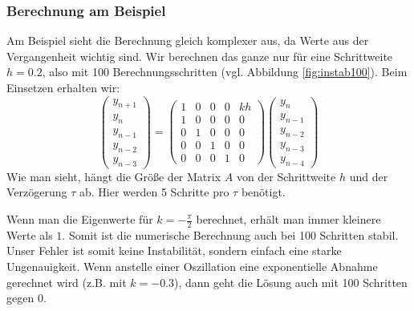 \subsubsection{Berechnung am Beispiel}
Am Beispiel sieht die Berechnung gleich komplexer aus, da Werte aus der Vergangenheit wichtig sind.
Wir berechnen das ganze nur für eine Schrittweite $h=0.2$, also mit 100 Berechnungsschritten (vgl. Abbildung \ref{fig:instab100}).
Beim Einsetzen erhalten wir: 
\begin{equation}
	\left( \begin{array}{c}y_{n+1} \\ y_n \\ y_{n-1} \\ y_{n-2} \\ y_{n-3} \end{array} \right) =
	\begin{pmatrix} 
	1 & 0 & 0 & 0 & kh \\
	1 & 0 & 0 & 0 & 0 \\
	0 & 1 & 0 & 0 & 0 \\
	0 & 0 & 1 & 0 & 0 \\
	0 & 0 & 0 & 1 & 0
	\end{pmatrix}
	\left( \begin{array}{c}y_{n} \\ y_{n-1} \\ y_{n-2} \\ y_{n-3} \\ y_{n-4} \end{array} \right)
\end{equation}
 Wie man sieht, hängt die Größe der Matrix $A$ von der Schrittweite $h$ und der Verzögerung $\tau$ ab.
 Hier werden 5 Schritte pro $\tau$ benötigt.
 
 Wenn man die Eigenwerte für $k=-\frac{\pi}{2}$ berechnet, erhält man immer kleinere Werte als $1$.
 Somit ist die numerische Berechnung auch bei 100 Schritten stabil.
 Unser Fehler ist somit keine Instabilität, sondern einfach eine starke Ungenauigkeit.
 Wenn anstelle einer Oszillation eine exponentielle Abnahme gerechnet wird (z.B. mit $k=-0.3$), dann geht die Lösung auch mit 100 Schritten gegen $0$.
 
